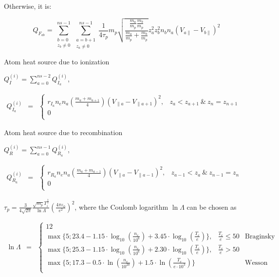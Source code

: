 \documentclass[a4paper,10pt]{report}
\begin{document}
Otherwise, it is:

\begin{equation*}
Q_{F_{ab}} =
\sum \limits^{ns-1}_{\substack{b = 0 \\ z_b \neq 0}}
\sum \limits^{ns-1}_{\substack{a = b + 1 \\ z_a \neq 0}}
\frac 1{4 \tau_p} m_p
\sqrt{ \frac {\frac{m_a}{m_p} \frac{m_b}{m_p}} {\frac{m_a}{m_p} + \frac{m_b}{m_p}} }
z_a^2 z_b^2 n_b n_a \left( V_{a \parallel} - V_{b \parallel} \right)^2
\end{equation*}

Atom heat source due to ionization

$Q_I^{(i)} = \sum \limits_{a=0}^{ns-2} Q_{I_a}^{(i)}$,

$
\begin{matrix}
Q_{I_a}^{(i)} & =
& \left\{
\begin{matrix}
r_{I_a} n_e n_a \left( \frac{m_a + m_{a+1}}4 \right)
\left( V_{\parallel a} - V_{\parallel a+1} \right)^2,
& z_a < z_{a+1} ~ \& ~ z_n = z_{n+1} \\
0 \\
\end{matrix} \right.
\end{matrix}
$

Atom heat source due to recombination


$Q_R^{(i)} = \sum \limits_{a=0}^{ns-1} Q_{R_a}^{(i)}$,

$
\begin{matrix}
Q_{R_a}^{(i)} & =
& \left\{
\begin{matrix}
r_{R_a} n_e n_a \left( \frac{m_a + m_{a-1}}4 \right)
\left( V_{\parallel a} - V_{\parallel a-1} \right)^2,
& z_{a-1} < z_a ~ \& ~ z_{n-1} = z_n \\
0 \\
\end{matrix} \right.
\end{matrix}
$

$\tau_p = \frac 3{4\sqrt{2\pi }} \frac{\sqrt{m_p} T_i^{\frac 3 2}}{\ln \Lambda} \left( \frac{4 \pi \varepsilon_0}{e^2}\right)^2$, where the Coulomb logarithm $\ln \Lambda $ can be chosen as

$
\begin{matrix}
\ln \Lambda & =
& \left\{
\begin{matrix}
12 \\
\max \{ 5; 23.4 - 1.15 \cdot \log_{10} \left( \frac{n_e}{10^6} \right) + 3.45 \cdot \log_{10} \left( \frac{T_e}e \right) \}, & \frac{T_e}{e} \leq 50 & \text{Braginsky formula} \\
\max \{ 5; 25.3 - 1.15 \cdot \log_{10} \left( \frac{n_e}{10^6} \right) + 2.30 \cdot \log_{10} \left( \frac{T_e}e \right) \}, & \frac{T_e}{e} > 50  \\
\max \{ 5; 17.3 - 0.5 \cdot \ln \left( \frac{n_e}{10^{20}} \right) + 1.5 \cdot \ln \left( \frac{T_e}{e \cdot 10^3} \right) \} && \text{Wesson formula for ion-ion collisions} \\
\end{matrix} \right.
\end{matrix}
$
\end{document}
